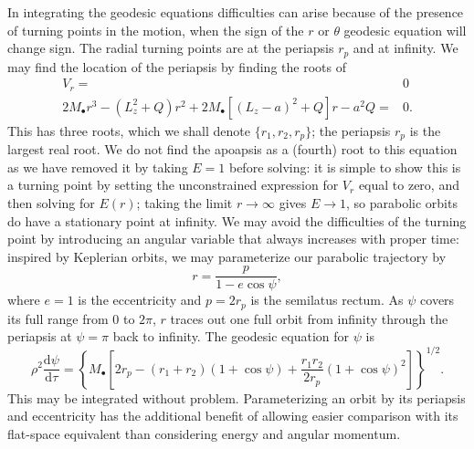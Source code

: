 \documentclass[a4paper, 11pt, titlepage, twoside]{report}
\newcommand{\dd}{\ensuremath{\mathrm{d}}}
\newcommand{\diff}[2]{\ensuremath{\frac{\dd {#1}}{\dd {#2}}}}
\begin{document}
{In integrating the geodesic equations difficulties can arise because of the presence of turning points in the motion, when the sign of the $r$ or $\theta$ geodesic equation will change sign. The radial turning points are at the periapsis $r_p$ and at infinity. We may find the location of the periapsis by finding the roots of
\begin{align}
V_r = {} & 0 \nonumber \\
2M_\bullet r^3 - \left(L_z^2+Q\right)r^2 + 2M_\bullet\left[\left(L_z - a\right)^2 + Q\right]r - a^2Q= {} & 0.
\end{align}
This has three roots, which we shall denote $\{r_1, r_2, r_p\}$; the periapsis $r_p$ is the largest real root. We do not find the apoapsis as a (fourth) root to this equation as we have removed it by taking $E = 1$ before solving: it is simple to show this is a turning point by setting the unconstrained expression for $V_r$ equal to zero, and then solving for $E(r)$; taking the limit $r \rightarrow \infty$ gives $E \rightarrow 1$, so parabolic orbits do have a stationary point at infinity\cite{Wilkins1972}. We may avoid the difficulties of the turning point by introducing an angular variable that always increases with proper time\cite{Drasco2004}: inspired by Keplerian orbits, we may parameterize our parabolic trajectory by
\begin{equation}
r = \frac{p}{1-e\cos\psi},
\end{equation}
where $e = 1$ is the eccentricity and $p = 2r_p$ is the semilatus rectum. As $\psi$ covers its full range from $0$ to $2\pi$, $r$ traces out one full orbit from infinity through the periapsis at $\psi = \pi$ back to infinity. The geodesic equation for $\psi$ is
\begin{equation}
\rho^2 \diff{\psi}{\tau} = \left\{M_\bullet\left[2r_p - \left(r_1 + r_2\right)\left(1 + \cos\psi\right) + \frac{r_1 r_2}{2r_p}\left(1 + \cos\psi\right)^2\right]\right\}^{1/2}.
\end{equation}
This may be integrated without problem. Parameterizing an orbit by its periapsis and eccentricity has the additional benefit of allowing easier comparison with its flat-space equivalent than considering energy and angular momentum\cite{Gair2005}.

}
\end{document}
